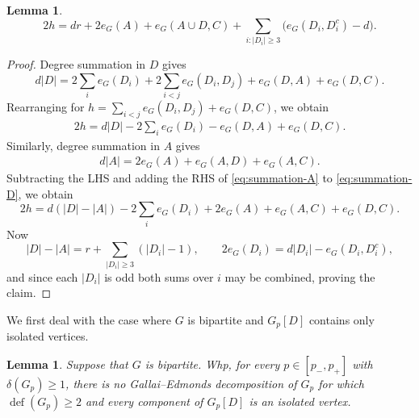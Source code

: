 \documentclass[notitlepage]{scrartcl}
\newtheorem{lemma}[thm]{Lemma}
\newcommand{\defi}{\operatorname{def}}
\begin{document}
\begin{lemma}\label{lem:ge-boundary-identity}
\begin{equation}\label{eq:ge-exact}
 2h=dr+2e_G(A)+e_G(A\cup D,C)  +\sum_{i:|D_i|\ge3}\bigl(e_G(D_i,D_i^c)-d\bigr).
\end{equation}
\end{lemma}

\begin{proof}
Degree summation in $D$ gives
\[
    d |D|= 2 \sum_{i} e_G(D_i)+ 2 \sum_{i<j} e_G(D_i, D_j) + e_G(D, A) + e_G(D, C).
\]
Rearranging for $h=\sum_{i<j}e_G(D_i,D_j)+e_G(D,C)$, we obtain
\begin{align} \label{eq:summation-D}
    2h=d|D|-2\sum_ie_G(D_i)-e_G(D,A)+e_G(D,C).
\end{align}
Similarly, degree summation in $A$ gives
\begin{align} \label{eq:summation-A}
    d |A| = 2 e_G(A) + e_G(A, D) + e_G(A, C).
\end{align}
Subtracting the LHS and adding the RHS of \eqref{eq:summation-A} to \eqref{eq:summation-D}, we obtain
\[
2h= d( |D|-|A|) - 2 \sum_{i} e_G(D_i) + 2 e_G(A) + e_G(A, C) + e_G(D, C).
\]
Now
\[
 |D|-|A|=r+\sum_{|D_i|\ge3}(|D_i|-1),  \qquad 2e_G(D_i)=d|D_i|-e_G(D_i,D_i^c),
\]
and since each $|D_i|$ is odd both sums over $i$ may be combined, proving the claim.
\end{proof}

We first deal with the case where $G$ is bipartite and $G_p[D]$ contains only isolated vertices.
\begin{lemma}\label{lem:bipartite-singletons}
Suppose that $G$ is bipartite.
Whp, for every $p\in[p_-,p_+]$ with $\delta(G_p)\ge1$, there is no Gallai--Edmonds decomposition of $G_p$ for which $\defi(G_p)\ge2$ and every component of $G_p[D]$ is an isolated vertex.
\end{lemma}
\end{document}
